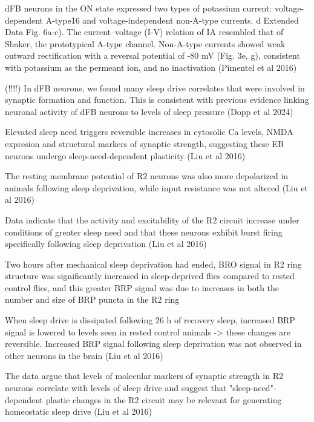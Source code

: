 dFB neurons in the ON state expressed two types of potassium  current: voltage-dependent
        A-type16 and voltage-independent non-A-type currents. d Extended Data Fig. 6a-c).
        The current–voltage (I-V) relation of IA resembled that of Shaker, the  prototypical
        A-type channel. Non-A-type currents showed weak outward rectification with a reversal
        potential of -80 mV (Fig. 3e, g), consistent with potassium as the permeant ion, and
        no inactivation
        \parencite{pimentelOperationHomeostaticSleep2016} (Pimentel et al 2016)

(!!!!) In dFB neurons, we found many sleep drive correlates that were involved in synaptic
        formation and function. This is consistent with previous evidence linking neuronal
        activity of dFB neurons to levels of sleep pressure (Dopp et al 2024)

Elevated sleep need triggers reversible increases in cytosolic Ca levels, NMDA expresion and structural markers
    of synaptic strength, suggesting these EB neurons undergo sleep-need-dependent plasticity \parencite{liuSleepDriveEncoded2016}
    (Liu et al 2016)

    The resting membrane potential of R2 neurons
    was also more depolarized in animals following sleep deprivation, while input resistance was not altered \parencite{liuSleepDriveEncoded2016}
    (Liu et al 2016)

    Data indicate that the activity and excitability of the R2 circuit increase under conditions of greater
    sleep need and that these neurons exhibit burst firing specifically following sleep deprivation \parencite{liuSleepDriveEncoded2016}
    (Liu et al 2016)

    Two hours after mechanical sleep deprivation had ended, BRO signal in R2 ring structure was significantly increased in sleep-deprived
    flies compared to rested control flies, and this greater BRP signal was due to increases in both the number and size
    of BRP puncta in the R2 ring \parencite{liuSleepDriveEncoded2016}

    When sleep drive is dissipated following 26 h of recovery sleep, increased BRP signal is lowered to levels seen in rested
    control animals -> these changes are reversible. Increased BRP signal following sleep
    deprivation was not observed in other neurons in the brain \parencite{liuSleepDriveEncoded2016}
    (Liu et al 2016)

    The data argue that levels of molecular markers of synaptic strength in R2 neurons correlate with levels of sleep
    drive and suggest that "sleep-need"-dependent plastic changes in the R2 circuit may be relevant for generating
    homeostatic sleep drive \parencite{liuSleepDriveEncoded2016}
    (Liu et al 2016)

